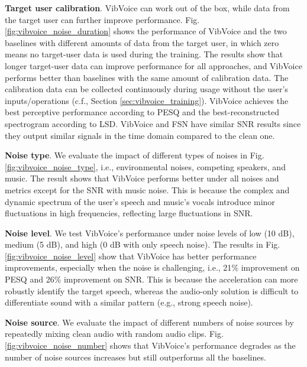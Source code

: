 \noindent\textbf{Target user calibration}.
VibVoice can work out of the box, while data from the target user can further improve performance. Fig. \ref{fig:vibvoice_noise_duration} shows the performance of VibVoice and the two baselines with different amounts of data from the target user, in which zero means no target-user data is used during the training. The results show that longer target-user data can improve performance for all approaches, and VibVoice performs better than baselines with the same amount of calibration data. The calibration data can be collected continuously during usage without the user’s inputs/operations (c.f., Section \ref{sec:vibvoice_training}).
VibVoice achieves the best perceptive performance according to PESQ and the best-reconstructed spectrogram according to LSD. VibVoice and FSN have similar SNR results since they output similar signals in the time domain compared to the clean one. 

\noindent\textbf{Noise type}.
We evaluate the impact of different types of noises in Fig. \ref{fig:vibvoice_noise_type}, i.e., environmental noises, competing speakers, and music. The result shows that VibVoice performs better under all noises and metrics except for the SNR with music noise. This is because the complex and dynamic spectrum of the user's speech and music's vocals introduce minor fluctuations in high frequencies, reflecting large fluctuations in SNR.

\noindent\textbf{Noise level}.
We test VibVoice's performance under noise levels of low (10 dB), medium (5 dB), and high (0 dB with only speech noise). The results in Fig. \ref{fig:vibvoice_noise_level} show that VibVoice has better performance improvements, especially when the noise is challenging, i.e., 21$\%$ improvement on PESQ and 26$\%$ improvement on SNR. This is because the acceleration can more robustly identify the target speech, whereas the audio-only solution is difficult to differentiate sound with a similar pattern (e.g., strong speech noise).

\noindent\textbf{Noise source}.
We evaluate the impact of different numbers of noise sources by repeatedly mixing clean audio with random audio clips. Fig. \ref{fig:vibvoice_noise_number} shows that VibVoice's performance degrades as the number of noise sources increases but still outperforms all the baselines.

